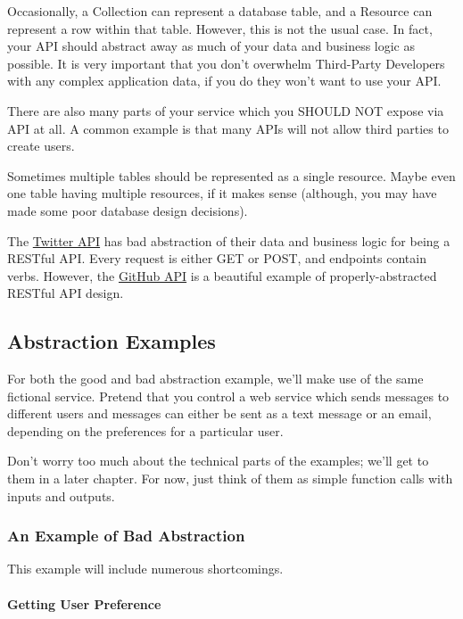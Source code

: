\documentclass{book}
\begin{document}
Occasionally, a Collection can represent a database table, and a Resource can represent a row within that table. However, this is not the usual case. In fact, your API should abstract away as much of your data and business logic as possible. It is very important that you don't overwhelm Third-Party Developers with any complex application data, if you do they won't want to use your API.

There are also many parts of your service which you SHOULD NOT expose via API at all. A common example is that many APIs will not allow third parties to create users.

Sometimes multiple tables should be represented as a single resource. Maybe even one table having multiple resources, if it makes sense (although, you may have made some poor database design decisions).

The \href{https://dev.twitter.com/docs/api/1.1}{Twitter API} has bad abstraction of their data and business logic for being a RESTful API. Every request is either GET or POST, and endpoints contain verbs. However, the \href{http://developer.github.com/v3/}{GitHub API} is a beautiful example of properly-abstracted RESTful API design.

\subsection{Abstraction Examples}

For both the good and bad abstraction example, we'll make use of the same fictional service. Pretend that you control a web service which sends messages to different users and messages can either be sent as a text message or an email, depending on the preferences for a particular user.

Don't worry too much about the technical parts of the examples; we'll get to them in a later chapter. For now, just think of them as simple function calls with inputs and outputs.

\subsubsection{An Example of Bad Abstraction}

This example will include numerous shortcomings.

\paragraph{\textbf{Getting User Preference}}
\end{document}
